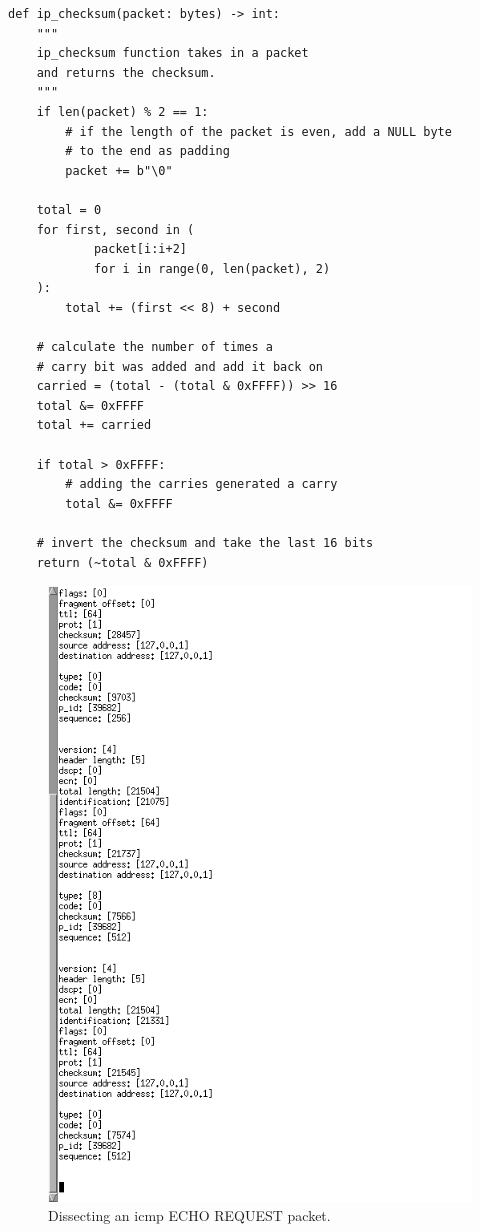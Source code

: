 \documentclass[titlepage]{article}
\begin{document}
\begin{lstlisting}[label=checksum,caption=A function for calculating the IP checksum for a set of btyes.]
def ip_checksum(packet: bytes) -> int:
    """
    ip_checksum function takes in a packet
    and returns the checksum.
    """
    if len(packet) % 2 == 1:
        # if the length of the packet is even, add a NULL byte
        # to the end as padding
        packet += b"\0"

    total = 0
    for first, second in (
            packet[i:i+2]
            for i in range(0, len(packet), 2)
    ):
        total += (first << 8) + second

    # calculate the number of times a
    # carry bit was added and add it back on
    carried = (total - (total & 0xFFFF)) >> 16
    total &= 0xFFFF
    total += carried

    if total > 0xFFFF:
        # adding the carries generated a carry
        total &= 0xFFFF

    # invert the checksum and take the last 16 bits
    return (~total & 0xFFFF)
\end{lstlisting}

\begin{figure}[H]
  \centering
  \includegraphics[width=\textwidth]{deconstructed_headers.png}
  \caption{%
    Dissecting an \gls{icmp} ECHO REQUEST packet.
  }\label{echodissect}
\end{figure}
\end{document}
